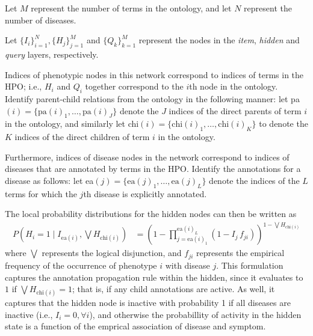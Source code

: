Let $M$ represent the number of terms in the ontology, and let $N$ represent the number of diseases.

Let 
$\{I_i\}_{i=1}^{N}, 
\{H_j\}_{j=1}^{M}$ and 
$\{Q_k\}_{k=1}^{M}$ represent the nodes in the {\it item}, {\it hidden} and {\it query} layers, respectively.

Indices of phenotypic nodes in this network correspond to indices of terms in the HPO;
i.e., $H_i$ and $Q_i$ together correspond to the $i$th node in the ontology.
Identify parent-child relations from the ontology in the following manner: 
let pa$(i) = \{\text{pa}(i)_1, \hdots, \text{pa}(i)_J\}$ denote the $J$ indices of the direct parents of term $i$ in the ontology, 
and similarly let chi$(i) = \{\text{chi}(i)_1, \hdots, \text{chi}(i)_K\}$ to denote the $K$ indices of the direct children of term $i$ in the ontology.

Furthermore, indices of disease nodes in the network correspond to indices of diseases that are annotated by terms in the HPO.
Identify the annotations for a disease as follows: let ea$(j) = \{\text{ea}(j)_1, \hdots, \text{ea}(j)_L\}$ denote the indices of the $L$ terms for which the $j$th disease is explicitly annotated.

The local probability distributions for the hidden nodes can then be written as
\begin{align*}
    P \left(H_i = 1 \mid I_{\text{ea}(i)}, \bigvee H_{\text{chi}(i)}\right)
    &= \left(
        1 - \prod_{j=\text{ea}(i)_1}^{\text{ea}(i)_L}
        \left(1 - I_j \, f_{ji}\right)
    \right)
    ^{1 - \bigvee H_{\text{chi}(i)}}
\end{align*}
where $\bigvee$ represents the logical disjunction, and $f_{ji}$ represents the empirical frequency of the occurrence of phenotype $i$ with disease $j$.
This formulation captures the annotation propagation rule within the hidden, since it evaluates to $1$ if $\bigvee H_{\text{chi}(i)} = 1$; that is, if any child annotations are active.
As well, it captures that the hidden node is inactive with probability 1 if all diseases are inactive (i.e., $I_i = 0, \forall i$), and otherwise the probabillity of activity in the hidden state is a function of the emprical association of disease and symptom.

